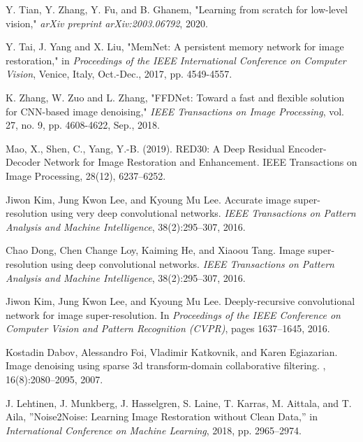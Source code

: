 \documentclass[a4paper,
               ]{jacow}
\begin{document}
%
%
%
	{\printbibliography}%
	{                    
	\begin{thebibliography}{9} %
	
        Y. Tian, Y. Zhang, Y. Fu, and B. Ghanem, "Learning from scratch for low-level vision," \textit{arXiv preprint arXiv:2003.06792}, 2020.

	
        Y. Tai, J. Yang and X. Liu, "MemNet: A persistent memory network for image restoration," in \emph{Proceedings of the IEEE International Conference on Computer Vision}, Venice, Italy, Oct.-Dec., 2017, pp. 4549-4557.

        K. Zhang, W. Zuo and L. Zhang, "FFDNet: Toward a fast and flexible solution for CNN-based image denoising," \emph{IEEE Transactions on Image Processing}, vol. 27, no. 9, pp. 4608-4622, Sep., 2018.


        Mao, X., Shen, C.,   Yang, Y.-B. (2019). RED30: A Deep Residual Encoder-Decoder Network for Image Restoration and Enhancement. IEEE Transactions on Image Processing, 28(12), 6237–6252.

        Jiwon Kim, Jung Kwon Lee, and Kyoung Mu Lee.
        Accurate image super-resolution using very deep convolutional networks.
        {\em IEEE Transactions on Pattern Analysis and Machine Intelligence}, 38(2):295--307, 2016.

        Chao Dong, Chen Change Loy, Kaiming He, and Xiaoou Tang.
        Image super-resolution using deep convolutional networks.
        {\em IEEE Transactions on Pattern Analysis and Machine Intelligence}, 38(2):295--307, 2016.

        Jiwon Kim, Jung Kwon Lee, and Kyoung Mu Lee.
        \newblock Deeply-recursive convolutional network for image super-resolution.
        \newblock In {\em Proceedings of the IEEE Conference on Computer Vision and Pattern Recognition (CVPR)}, pages 1637--1645, 2016.
	
        Kostadin Dabov, Alessandro Foi, Vladimir Katkovnik, and Karen Egiazarian.
        \newblock Image denoising using sparse 3d transform-domain collaborative filtering.
        , 16(8):2080--2095, 2007.

        J. Lehtinen, J. Munkberg, J. Hasselgren, S. Laine, T. Karras, M. Aittala, and T. Aila,
        ''Noise2Noise: Learning Image Restoration without Clean Data,''
        in \emph{International Conference on Machine Learning}, 2018, pp. 2965--2974.


\end{thebibliography}}
\end{document}

